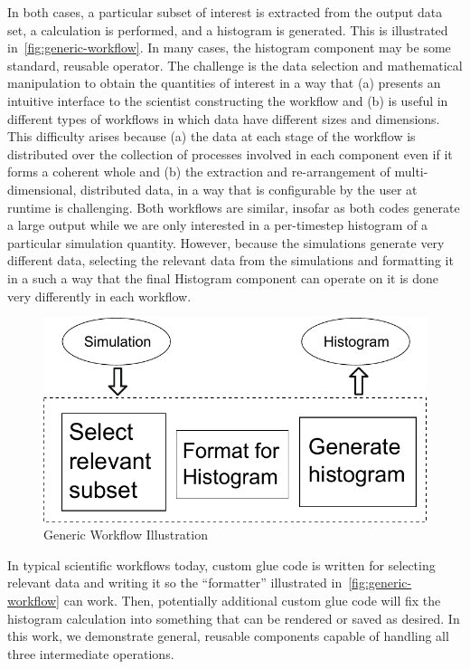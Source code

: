 \documentclass[conference]{IEEEtran}
\begin{document}
In both cases, a particular subset of interest is extracted from the
output data set, a calculation is performed, and a histogram is
generated. This is illustrated in~\autoref{fig:generic-workflow}. In many
cases, the histogram component may be some standard, reusable operator.
The challenge is the data selection and mathematical
manipulation to obtain the quantities of interest in a way that (a) presents an
intuitive interface to the scientist constructing the workflow and (b) is
useful in different types of workflows in which data have different sizes and
dimensions.  This difficulty arises because (a) the data at each stage of the
workflow is distributed over the collection of processes involved in each
component even if it forms a coherent whole and (b) the extraction and
re-arrangement of multi-dimensional, distributed data, in a way that is
configurable by the user at runtime is challenging.  Both workflows are
similar, insofar as both codes generate a large output while we are only
interested in a per-timestep histogram of a particular simulation quantity.
However, because the simulations generate very different data, selecting the
relevant data from the simulations and formatting it in a such a way that the
final Histogram component can operate on it is done very differently in each
workflow.

\begin{figure}[htbp]
  \vspace{-0.1in}
  \centering
  \includegraphics[width=0.7\columnwidth]{fig/gwflow}
  \vspace{-0.09in}
  \caption{Generic Workflow Illustration}
  \label{fig:generic-workflow}
  \vspace{-0.10in}
\end{figure}

In typical scientific workflows today, custom glue code is written for
selecting relevant data and writing it so the ``formatter'' illustrated in~\autoref{fig:generic-workflow} can work.  Then, potentially additional
custom glue code will fix the histogram calculation into something that can be
rendered or saved as desired.  In this work, we demonstrate general, reusable
components capable of handling all three intermediate operations.
\end{document}
